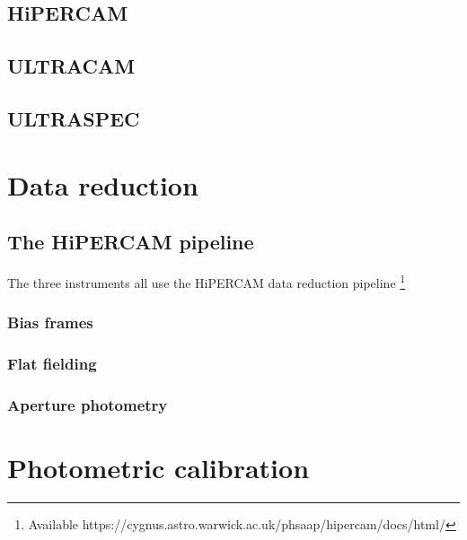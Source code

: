 \subsection{HiPERCAM}


\subsection{ULTRACAM}


\subsection{ULTRASPEC}


\section{Data reduction}
\label{sect:data reduction}

\subsection{The HiPERCAM pipeline}
The three instruments all use the HiPERCAM data reduction pipeline \footnote{Available https://cygnus.astro.warwick.ac.uk/phsaap/hipercam/docs/html/}

\subsubsection{Bias frames}

\subsubsection{Flat fielding}

\subsubsection{Aperture photometry}

\section{Photometric calibration}
\label{sect:photometric extraction and calibration}

